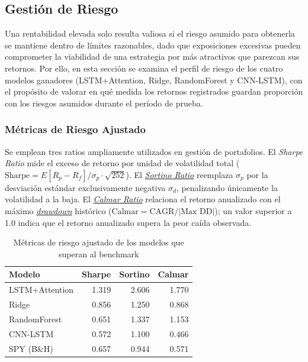 
\subsection{Gesti\'on de Riesgo}
\label{sec:risk_management}

Una rentabilidad elevada solo resulta valiosa si el riesgo asumido para obtenerla se mantiene dentro de l\'imites razonables, dado que exposiciones excesivas pueden comprometer la viabilidad de una estrategia por m\'as atractivos que parezcan sus retornos. Por ello, en esta secci\'on se examina el perfil de riesgo de los cuatro modelos ganadores (LSTM+Attention, Ridge, RandomForest y CNN-LSTM), con el prop\'osito de valorar en qu\'e medida los retornos registrados guardan proporci\'on con los riesgos asumidos durante el per\'iodo de prueba.

\subsubsection{M\'etricas de Riesgo Ajustado}
\label{subsec:risk_adjusted_metrics}

Se emplean tres ratios ampliamente utilizados en gesti\'on de portafolios. El \textit{Sharpe Ratio} \citep{sharpe1966mutual} mide el exceso de retorno por unidad de volatilidad total ($\text{Sharpe} = E[R_p - R_f] / \sigma_p \cdot \sqrt{252}$). El \hyperlink{glos:sortino_ratio}{\textit{Sortino Ratio}} \citep{sortino1991} reemplaza $\sigma_p$ por la desviaci\'on est\'andar exclusivamente negativa $\sigma_d$, penalizando \'unicamente la volatilidad a la baja. El \hyperlink{glos:calmar_ratio}{\textit{Calmar Ratio}} relaciona el retorno anualizado con el m\'aximo \hyperlink{glos:drawdown}{\textit{drawdown}} hist\'orico ($\text{Calmar} = \text{CAGR} / |\text{Max DD}|$); un valor superior a 1.0 indica que el retorno anualizado supera la peor ca\'ida observada.

\begin{table}[htbp]
\centering
\caption{M\'etricas de riesgo ajustado de los modelos que superan al benchmark}
\label{tab:risk_adjusted_metrics}
\small
\begin{tabular}{@{}lrrr@{}}
\toprule
\textbf{Modelo} & \textbf{Sharpe} & \textbf{Sortino} & \textbf{Calmar} \\
\midrule
LSTM+Attention & 1.319 & 2.606 & 1.770 \\
Ridge & 0.856 & 1.250 & 0.868 \\
RandomForest & 0.651 & 1.337 & 1.153 \\
CNN-LSTM & 0.572 & 1.100 & 0.466 \\
\midrule
SPY (B\&H) & 0.657 & 0.944 & 0.571 \\
\bottomrule
\end{tabular}
\end{table}

